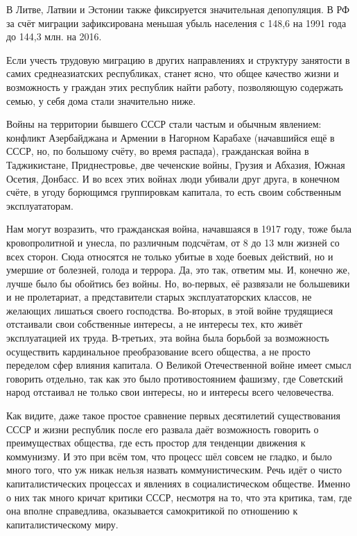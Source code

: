 \documentclass[../main]{subfiles}
\begin{document}
В Литве, Латвии и Эстонии также фиксируется значительная депопуляция. В РФ за счёт миграции зафиксирована меньшая убыль населения с 148,6 на 1991 года до 144,3 млн. на 2016.

Если учесть трудовую миграцию в других направлениях и структуру занятости в самих среднеазиатских республиках, станет ясно, что общее качество жизни и возможность у граждан этих республик найти работу, позволяющую содержать семью, у себя дома стали значительно ниже.

Войны на территории бывшего СССР стали частым и обычным явлением: конфликт Азербайджана и Армении в Нагорном Карабахе (начавшийся ещё в СССР, но, по большому счёту, во время распада), гражданская война в Таджикистане, Приднестровье, две чеченские войны, Грузия и Абхазия, Южная Осетия, Донбасс. И во всех этих войнах люди убивали друг друга, в конечном счёте, в угоду борющимся группировкам капитала, то есть своим собственным эксплуататорам.

Нам могут возразить, что гражданская война, начавшаяся в 1917 году, тоже была кровопролитной и унесла, по различным подсчётам, от 8 до 13 млн жизней со всех сторон. Сюда относятся не только убитые в ходе боевых действий, но и умершие от болезней, голода и террора. Да, это так, ответим мы. И, конечно же, лучше было бы обойтись без войны. Но, во-первых, её развязали не большевики и не пролетариат, а представители старых эксплуататорских классов, не желающих лишаться своего господства. Во-вторых, в этой войне трудящиеся отстаивали свои собственные интересы, а не интересы тех, кто живёт эксплуатацией их труда. В-третьих, эта война была борьбой за возможность осуществить кардинальное преобразование всего общества, а не просто переделом сфер влияния капитала. О Великой Отечественной войне имеет смысл говорить отдельно, так как это было противостоянием фашизму, где Советский народ отстаивал не только свои интересы, но и интересы всего человечества.

Как видите, даже такое простое сравнение первых десятилетий существования СССР и жизни республик после его развала даёт возможность говорить о преимуществах общества, где есть простор для тенденции движения к коммунизму. И это при всём том, что процесс шёл совсем не гладко, и было много того, что уж никак нельзя назвать коммунистическим. Речь идёт о чисто капиталистических процессах и явлениях в социалистическом обществе. Именно о них так много кричат критики СССР, несмотря на то, что эта критика, там, где она вполне справедлива, оказывается самокритикой по отношению к капиталистическому миру.
\end{document}
